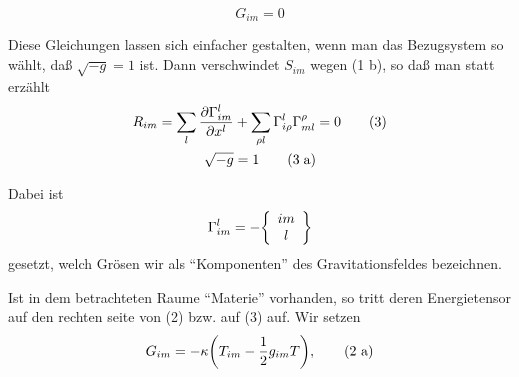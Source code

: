 \documentclass[10pt]{article}
\begin{document}
\begin{equation}
G_{im} = 0 \tag{2}
\end{equation}

Diese Gleichungen lassen sich einfacher gestalten, wenn man das Bezugsystem so w\"{a}hlt, da{\ss} $\sqrt{-g} =1$ ist. Dann verschwindet $S_{im}$ wegen (1 b), so da{\ss} man statt erz\"{a}hlt
\begin{align}
R_{im} = \sum_{l} \pdv{\Gamma^{l}_{im}}{x^l} &+ \sum_{\rho l} \Gamma^l_{i\rho} \Gamma^\rho_{ml} = 0 \tag{3} \\
\sqrt{-g} &= 1 \tag{3\;a}
\end{align}

Dabei ist
\begin{equation}
\Gamma^{l}_{im} = - \qty{\begin{array}{cc} im \\ l \end{array}}
\end{equation}
gesetzt, welch Gr\"{o}sen wir als ``Komponenten'' des Gravitationsfeldes bezeichnen.

Ist in dem betrachteten Raume ``Materie'' vorhanden, so tritt deren Energietensor auf den rechten seite von (2) bzw. auf (3) auf. Wir setzen
\begin{equation}
G_{im} = -\kappa \qty( T_{im} - \frac{1}{2}g_{im}T) , \tag{2 a}
\end{equation}
\end{document}
